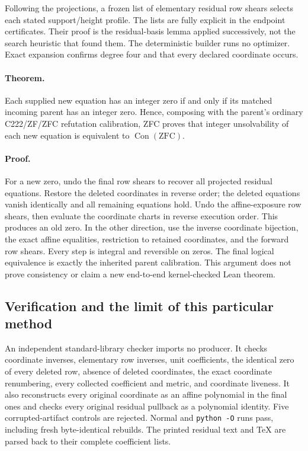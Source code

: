Following the projections, a frozen list of elementary residual row
shears selects each stated support/height profile.  The lists are fully
explicit in the endpoint certificates.  Their proof is the residual-basis
lemma applied successively, not the search heuristic that found them.
The deterministic builder runs no optimizer.  Exact expansion confirms
degree four and that every declared coordinate occurs.

\paragraph{Theorem.}
Each supplied new equation has an integer zero if and only if its
matched incoming parent has an integer zero.  Hence, composing with the
parent's ordinary C222/ZF/ZFC refutation calibration, ZFC proves that
integer unsolvability of each new equation is equivalent to
$\operatorname{Con}(\mathrm{ZFC})$.

\paragraph{Proof.}
For a new zero, undo the final row shears to recover all projected
residual equations.  Restore the deleted coordinates in reverse order;
the deleted equations vanish identically and all remaining equations
hold.  Undo the affine-exposure row shears, then evaluate the coordinate
charts in reverse execution order.  This produces an old zero.  In the
other direction, use the inverse coordinate bijection, the exact affine
equalities, restriction to retained coordinates, and the forward row
shears.  Every step is integral and reversible on zeros.  The final
logical equivalence is exactly the inherited parent calibration.
This argument does not prove consistency or claim a new end-to-end
kernel-checked Lean theorem.

\subsection{Verification and the limit of this particular method}

An independent standard-library checker imports no producer.  It checks
coordinate inverses, elementary row inverses, unit coefficients, the
identical zero of every deleted row, absence of deleted coordinates,
the exact coordinate renumbering, every collected coefficient and metric,
and coordinate liveness.  It also reconstructs every original coordinate
as an affine polynomial in the final ones and checks every original
residual pullback as a polynomial identity.  Five corrupted-artifact
controls are rejected.  Normal and \texttt{python -O} runs pass, including
fresh byte-identical rebuilds.  The printed residual text and TeX are
parsed back to their complete coefficient lists.

